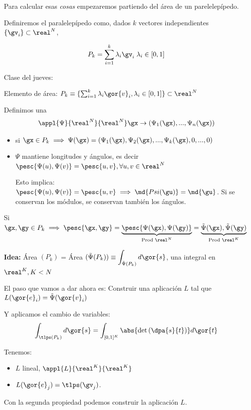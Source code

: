 Para calcular esas \textit{cosas} empezaremos partiendo del área de un parelelepípedo.

Definiremos el paralelepípedo como, dados $k$ vectores independientes $\{\gv_i\} \subset \real^N$, 

\[ P_k = \sum_{i=1}^k \lambda_i\gv_i\;\lambda_i \in [0,1] \]

Clase del jueves:


Elemento de área: $P_k \equiv \{ \sum_{i=1}^k \lambda_i\gor{v}_i, \lambda_i \in [0,1]\}\subset \real^N$

Definimos una \begin{gather*}
\appl{\Psi}{\real^N}{\real^N}
\gx \rightarrow (\Psi_1(\gx),...,\Psi_n(\gx))
\end{gather*}

\begin{itemize}
\item si $\gx \in P_k \implies \Psi(\gx) = (\Psi_1(\gx),\Psi_2(\gx),...,\Psi_k(\gx),0,...,0)$
\item $\Psi$ mantiene longitudes y ángulos, es decir $\pesc{\Psi(u),\Psi(v)}=\pesc{u,v}, \forall u,v\in\real^N$

Esto implica: $\pesc{\Psi(u),\Psi(v)}=\pesc{u,v} \implies \md{Psi(\gu)} = \md{\gu}$. Si se conservan los módulos, se conservan también los ángulos.
\end{itemize}

\obs Si $\gx,\gy\in P_k \implies \pesc{\gx,\gy} = \underbrace{\pesc{\Psi(\gx),\Psi(\gy)}}_{\text{Prod } \real^N} = \underbrace{{\tilde{\Psi}(\gx),\tilde{\Psi}(\gy)}}_{\text{Prod } \real^K}$


\textbf{Idea:} Área $(P_k)$ = Área $(\tilde{\Psi}(P_k)) \equiv \displaystyle \int_{\tilde{\Psi}(P_k)}d\gor{s}$, una integral en $\real^K, K<N$



El paso que vamos a dar ahora es: Construir una aplicación $L$ tal que $L(\gor{e}_i) = \tilde{\Psi}(\gor{v}_i)$

Y aplicamos el cambio de variables:
\[\int_{\tlps(P_k)} d\gor{s} = \int_{[0,1]^K} \abs{\det\left( \dpa{s}{t} \right)} d\gor{t}\]

Tenemos: 
\begin{itemize}
\item $L$ lineal, $\appl{L}{\real^K}{\real^K}$
\item $L(\gor{e}_j) = \tlps(\gv_j)$.
\end{itemize}
Con la segunda propiedad podemos construir la aplicación $L$.

